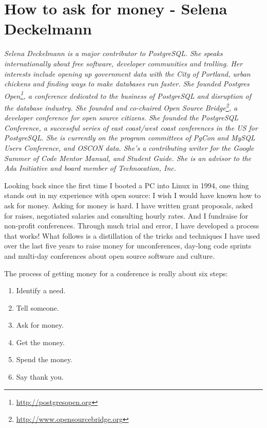 \chapter{How to ask for money - Selena Deckelmann}

\textit{Selena Deckelmann is a major contributor to PostgreSQL. She speaks internationally about free software, developer communities and trolling. Her interests include opening up government data with the City of Portland, urban chickens and finding ways to make databases run faster.
\newline
She founded Postgres Open\footnote{\url{http://postgresopen.org}}, a conference dedicated to the business of PostgreSQL and disruption of the database industry. She founded and co-chaired Open Source Bridge\footnote{\url{http://www.opensourcebridge.org}}, a developer conference for open source citizens. She founded the PostgreSQL Conference, a successful series of east coast/west coast conferences in the US for PostgreSQL. She is currently on the program committees of PgCon and MySQL Users Conference, and OSCON data. She's a contributing writer for the Google Summer of Code Mentor Manual, and Student Guide. She is an advisor to the Ada Initiative and board member of Technocation, Inc.}

Looking back since the first time I booted a PC into Linux in 1994, one thing stands out in my experience with open source: I wish I would have known how to ask for money.
Asking for money is hard. I have written grant proposals, asked for raises, negotiated salaries and consulting hourly rates. And I fundraise for non-profit conferences. Through much trial and error, I have developed a process that works!
What follows is a distillation of the tricks and techniques I have used over the last five years to raise money for unconferences, day-long code sprints and multi-day conferences about open source software and culture.

The process of getting money for a conference is really about six steps: 
\begin{enumerate}
 \item Identify a need. 
 \item Tell someone. 
 \item Ask for money.
 \item Get the money.
 \item Spend the money. 
 \item Say thank you.
\end{enumerate}

